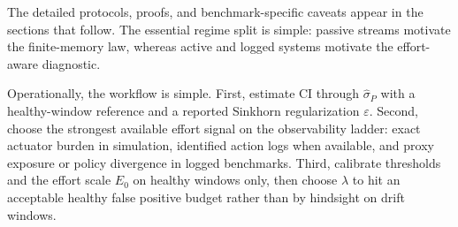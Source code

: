 The detailed protocols, proofs, and benchmark-specific caveats appear in the
sections that follow. The essential regime split is simple:
passive streams motivate the finite-memory law, whereas active and logged systems
motivate the effort-aware diagnostic.

Operationally, the workflow is simple. First,
estimate CI through $\hat\sigma_P$ with a healthy-window reference and a reported
Sinkhorn regularization $\varepsilon$. Second, choose the strongest available
effort signal on the observability ladder: exact actuator burden in simulation,
identified action logs when available, and proxy exposure or policy divergence in
logged benchmarks. Third, calibrate thresholds and the effort scale $E_0$ on
healthy windows only, then choose $\lambda$ to hit an acceptable healthy false
positive budget rather than by hindsight on drift windows.
